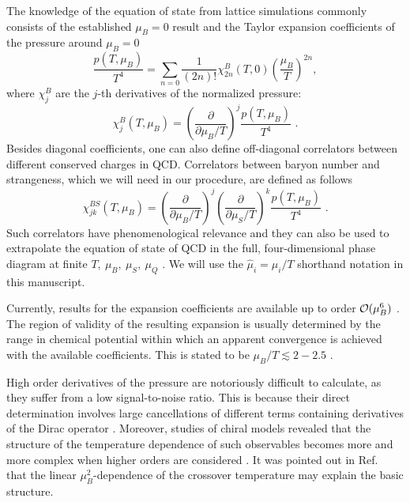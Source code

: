 \documentclass[aps,prd,twocolumn,superscriptaddress]{revtex4-2}
\newcommand \hmu {\hat{\mu}}
\newcommand{\calO}{{\cal O}}
\begin{document}

The knowledge of the equation of state from lattice 
simulations commonly consists of the established
$\mu_B=0$ result \cite{Borsanyi:2013bia,Bazavov:2014pvz}
and the Taylor expansion coefficients of the pressure around 
$\mu_B=0$
\begin{equation}
\frac{p(T,\mu_B)}{T^4}
=
\sum_{n=0} \frac{1}{(2n)!} \chi^B_{2n}(T,0) \left(\frac{\mu_B}{T}\right)^{2n},
\label{eq:ptaylor}
\end{equation}
where $\chi^B_j$ are the $j$-th derivatives of the normalized pressure:
\begin{equation}
\chi^{B}_{j}(T,\mu_B) = 
\left(\frac{\partial}{\partial \mu_B/T}\right)^j
 \frac{p(T,\mu_B)}{T^4} \, \, .
\end{equation}
Besides diagonal coefficients, one can also define off-diagonal correlators between different conserved charges in QCD. Correlators between baryon number and strangeness, which we will need in our procedure, are defined as follows
\begin{equation}
\chi^{BS}_{jk}(T,\mu_B) = 
\left(\frac{\partial}{\partial \mu_B/T}\right)^j
\left(\frac{\partial}{\partial \mu_S/T}\right)^k
 \frac{p(T,\mu_B)}{T^4} \, \, .
\end{equation}
Such correlators have phenomenological relevance \cite{Bellwied:2019pxh} and they can also be used to extrapolate the equation of state of QCD in the full, four-dimensional phase diagram at finite $T,~\mu_B,~\mu_S,~\mu_Q$ \cite{Noronha-Hostler:2019ayj,Monnai:2019hkn}.
We will use the $\hmu_i=\mu_i/T$ shorthand notation in this manuscript.

Currently, results for the expansion coefficients
are available up to order $\calO (\mu_B^6)$
\cite{Bazavov:2020bjn,Borsanyi:2018grb}. The region 
of validity of the resulting expansion is usually 
determined by the range in chemical potential within 
which an apparent convergence is achieved with the
available coefficients. This is stated to be 
$\mu_B/T \lesssim 2-2.5$ \cite{Gunther:2016vcp,Bazavov:2017dus}.

High order derivatives of the pressure are notoriously 
difficult to calculate, as they suffer from a low signal-to-noise ratio. This is because their direct determination
involves large cancellations of different terms 
containing derivatives of the Dirac operator \cite{Bellwied:2015lba}.
Moreover, studies of chiral models revealed that the structure of the
temperature dependence of such observables becomes more and 
more complex when higher orders are considered \cite{Friman:2011pf}.
It was pointed out in Ref.~\cite{Borsanyi:2018grb} that 
the linear $\mu_B^2$-dependence of the crossover temperature may
explain the basic structure.
\end{document}
